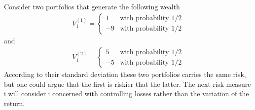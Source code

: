 \documentclass{article}
\theoremstyle{definition}
\numberwithin{equation}{section}
\begin{document}
Consider two portfolios that generate the following wealth
\begin{align}
    V_1^{(1)} = 
    \begin{cases}
        1 &\text{with probability $1/2$} \\
        -9 &\text{with probability $1/2$}    
    \end{cases}
\end{align}
and
\begin{align}
    V_1^{(2)} = 
    \begin{cases}
        5 &\text{with probability $1/2$} \\
        -5 &\text{with probability $1/2$}    
    \end{cases}
\end{align}
According to their standard deviation these two portfolios carries the same risk, but one could argue that the first is riskier that the latter.
The next risk measure i will consider i concerned with controlling losses rather than the variation of the return.
\end{document}
